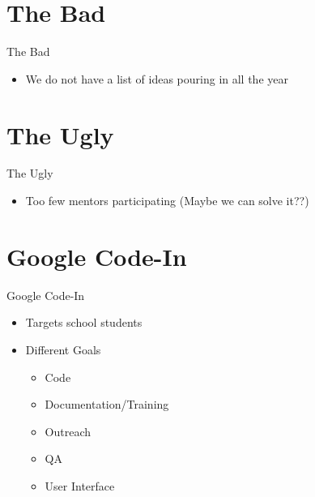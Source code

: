 \documentclass{beamer}
\begin{document}
\section{The Bad}
\begin{frame}{The Bad}
\pause
\begin{itemize}
\item We do not have a list of ideas pouring in all the year \pause
\end{itemize}
\end{frame}

\section{The Ugly}
\begin{frame}{The Ugly}
\pause
\begin{itemize}
\item Too few mentors participating (Maybe we can solve it??) \pause
\end{itemize}
\end{frame}

\section{Google Code-In}
\begin{frame}{Google Code-In}
\pause
\begin{itemize}
\item Targets school students
\item Different Goals
\pause
\begin{itemize}
\item Code
\item Documentation/Training
\item Outreach
\item QA
\item User Interface
\end{itemize}
\end{itemize}
\end{frame}
\end{document}
